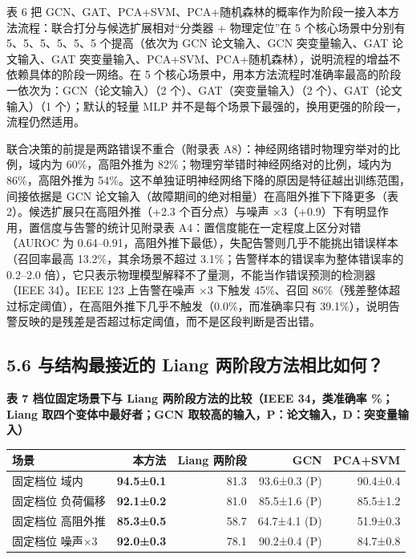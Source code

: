 \documentclass[
  11pt,
]{ctexart}
\begin{document}
表 6 把
GCN、GAT、PCA+SVM、PCA+随机森林的概率作为阶段一接入本方法流程：联合打分与候选扩展相对``分类器
+ 物理定位''在 5 个核心场景中分别有 5、5、5、5、5、5 个提高（依次为 GCN
论文输入、GCN 突变量输入、GAT 论文输入、GAT
突变量输入、PCA+SVM、PCA+随机森林），说明流程的增益不依赖具体的阶段一网络。在
5
个核心场景中，用本方法流程时准确率最高的阶段一依次为：GCN（论文输入）（2
个）、GAT（突变量输入）（2 个）、GAT（论文输入）（1 个）；默认的轻量 MLP
并不是每个场景下最强的，换用更强的阶段一，流程仍然适用。

联合决策的前提是两路错误不重合（附录表
A8）：神经网络错时物理穷举对的比例，域内为 60\%，高阻外推为
82\%；物理穷举错时神经网络对的比例，域内为 86\%，高阻外推为
54\%。这不单独证明神经网络下降的原因是特征越出训练范围，间接依据是 GCN
论文输入（故障期间的绝对相量）在高阻外推下下降更多（表
2）。候选扩展只在高阻外推（+2.3 个百分点）与噪声
×3（+0.9）下有明显作用，置信度与告警的统计见附录表
A4：置信度能在一定程度上区分对错（AUROC 为
0.64--0.91，高阻外推下最低），失配告警则几乎不能挑出错误样本（召回率最高
13.2\%，其余场景不超过 3.1\%；告警样本的错误率为整体错误率的 0.2--2.0
倍），它只表示物理模型解释不了量测，不能当作错误预测的检测器（IEEE
34）。IEEE 123 上告警在噪声 ×3 下触发 45\%、召回
86\%（残差整体超过标定阈值），在高阻外推下几乎不触发（0.0\%，而准确率只有
39.1\%），说明告警反映的是残差是否超过标定阈值，而不是区段判断是否出错。

\hypertarget{ux4e0eux7ed3ux6784ux6700ux63a5ux8fd1ux7684-liang-ux4e24ux9636ux6bb5ux65b9ux6cd5ux76f8ux6bd4ux5982ux4f55}{%
\subsection{5.6 与结构最接近的 Liang
两阶段方法相比如何？}\label{ux4e0eux7ed3ux6784ux6700ux63a5ux8fd1ux7684-liang-ux4e24ux9636ux6bb5ux65b9ux6cd5ux76f8ux6bd4ux5982ux4f55}}

\textbf{表 7 档位固定场景下与 Liang 两阶段方法的比较（IEEE 34，类准确率
\%；Liang 取四个变体中最好者；GCN
取较高的输入，P：论文输入，D：突变量输入）}

\begin{longtable}[]{@{}lrrrr@{}}
\toprule\noalign{}
场景 & 本方法 & Liang 两阶段 & GCN & PCA+SVM \\
\midrule\noalign{}
\endhead
\bottomrule\noalign{}
\endlastfoot
固定档位 域内 & \textbf{94.5±0.1} & 81.3 & 93.6±0.3 (P) & 90.4±0.4 \\
固定档位 负荷偏移 & \textbf{92.1±0.2} & 81.0 & 85.5±1.6 (P) &
85.5±1.2 \\
固定档位 高阻外推 & \textbf{85.3±0.5} & 58.7 & 64.7±4.1 (D) &
51.9±0.3 \\
固定档位 噪声×3 & \textbf{92.0±0.3} & 78.1 & 90.2±0.4 (P) & 84.7±0.8 \\
\end{longtable}
\end{document}
